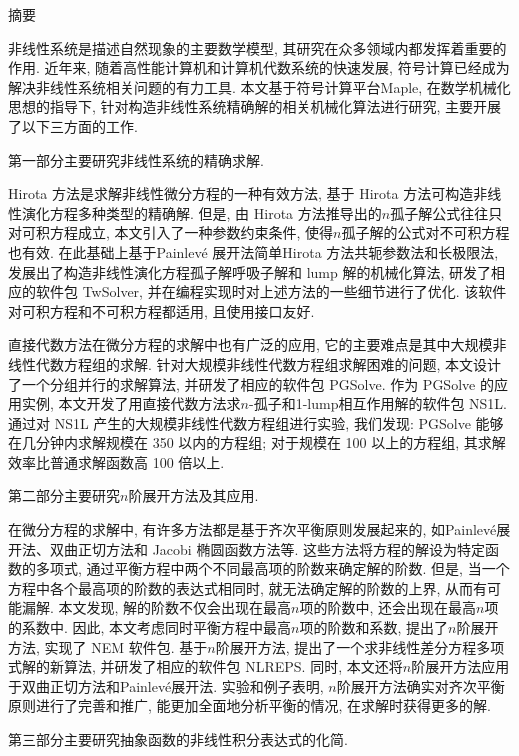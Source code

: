 {}
\centerline{\heiti 摘\quad 要}

\linespread{1.4} \bigskip

非线性系统是描述自然现象的主要数学模型, 其研究在众多领域内都发挥着重要的作用. 近年来, 随着高性能计算机和计算机代数系统的快速发展, 符号计算已经成为解决非线性系统相关问题的有力工具. 本文基于符号计算平台Maple, 在数学机械化思想的指导下, 针对构造非线性系统精确解的相关机械化算法进行研究, 主要开展了以下三方面的工作.

第一部分主要研究非线性系统的精确求解.

Hirota 方法是求解非线性微分方程的一种有效方法, 基于 Hirota 方法可构造非线性演化方程多种类型的精确解. 但是, 由 Hirota 方法推导出的$n$孤子解公式往往只对可积方程成立, 本文引入了一种参数约束条件, 使得$n$孤子解的公式对不可积方程也有效. 在此基础上基于Painlevé 展开法\D 简单Hirota 方法\D 共轭参数法和长极限法, 发展出了构造非线性演化方程孤子解\D 呼吸子解和 lump 解的机械化算法, 研发了相应的软件包 TwSolver, 并在编程实现时对上述方法的一些细节进行了优化. 该软件对可积方程和不可积方程都适用, 且使用接口友好. 

直接代数方法在微分方程的求解中也有广泛的应用, 它的主要难点是其中大规模非线性代数方程组的求解. 针对大规模非线性代数方程组求解困难的问题, 本文设计了一个分组并行的求解算法, 并研发了相应的软件包 PGSolve. 作为 PGSolve 的应用实例, 本文开发了用直接代数方法求$n$-孤子和1-lump相互作用解的软件包 NS1L. 通过对 NS1L 产生的大规模非线性代数方程组进行实验, 我们发现: PGSolve 能够在几分钟内求解规模在 350 以内的方程组; 对于规模在 100 以上的方程组, 其求解效率比普通求解函数高 100 倍以上. 

第二部分主要研究$n$阶展开方法及其应用. 

在微分方程的求解中, 有许多方法都是基于齐次平衡原则发展起来的, 如Painlevé展开法、双曲正切方法和 Jacobi 椭圆函数方法等. 这些方法将方程的解设为特定函数的多项式, 通过平衡方程中两个不同最高项的阶数来确定解的阶数. 但是, 当一个方程中各个最高项的阶数的表达式相同时, 就无法确定解的阶数的上界, 从而有可能漏解. 本文发现, 解的阶数不仅会出现在最高$n$项的阶数中, 还会出现在最高$n$项的系数中. 因此, 本文考虑同时平衡方程中最高$n$项的阶数和系数, 提出了$n$阶展开方法, 实现了 NEM 软件包. 基于$n$阶展开方法, 提出了一个求非线性差分方程多项式解的新算法, 并研发了相应的软件包 NLREPS. 同时, 本文还将$n$阶展开方法应用于双曲正切方法和Painlevé展开法. 实验和例子表明, $n$阶展开方法确实对齐次平衡原则进行了完善和推广, 能更加全面地分析平衡的情况, 在求解时获得更多的解. 

第三部分主要研究抽象函数的非线性积分表达式的化简.

